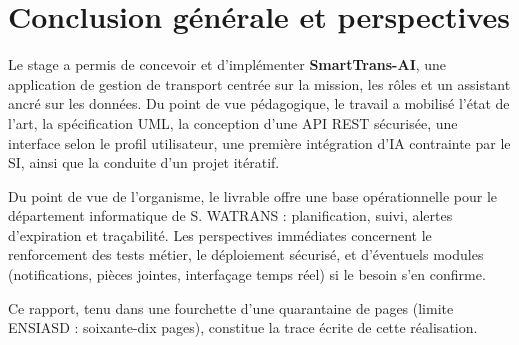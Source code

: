 \chapter*{Conclusion générale et perspectives}

Le stage a permis de concevoir et d'implémenter \textbf{SmartTrans-AI}, une application de gestion de transport centrée sur la mission, les rôles et un assistant ancré sur les données. Du point de vue pédagogique, le travail a mobilisé l'état de l'art, la spécification UML, la conception d'une API REST sécurisée, une interface selon le profil utilisateur, une première intégration d'IA contrainte par le SI, ainsi que la conduite d'un projet itératif.

Du point de vue de l'organisme, le livrable offre une base opérationnelle pour le département informatique de S. WATRANS : planification, suivi, alertes d'expiration et traçabilité. Les perspectives immédiates concernent le renforcement des tests métier, le déploiement sécurisé, et d'éventuels modules (notifications, pièces jointes, interfaçage temps réel) si le besoin s'en confirme.

Ce rapport, tenu dans une fourchette d'une quarantaine de pages (limite ENSIASD : soixante-dix pages), constitue la trace écrite de cette réalisation.
